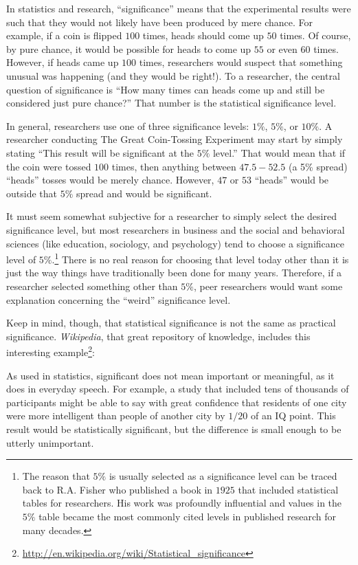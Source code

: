 In statistics and research, ``significance'' means that the experimental results were such that they would not likely have been produced by mere chance. For example, if a coin is flipped $ 100 $ times, heads should come up $ 50 $ times. Of course, by pure chance, it would be possible for heads to come up $ 55 $ or even $ 60 $ times. However, if heads came up $ 100 $ times, researchers would suspect that something unusual was happening (and they would be right!). To a researcher, the central question of significance is ``How many times can heads come up and still be considered just pure chance?'' That number is the statistical significance level. 

In general, researchers use one of three significance levels: $ 1\% $, $ 5\% $, or $ 10\% $. A researcher conducting The Great Coin-Tossing Experiment may start by simply stating ``This result will be significant at the $ 5\% $ level.'' That would mean that if the coin were tossed $ 100 $ times, then anything between $ 47.5-52.5 $ (a 5\% spread) ``heads'' tosses would be merely chance. However, $ 47 $ or $ 53 $ ``heads'' would be outside that $ 5\% $ spread and would be significant. 

It must seem somewhat subjective for a researcher to simply select the desired significance level, but most researchers in business and the social and behavioral sciences (like education, sociology, and psychology) tend to choose a significance level of $ 5\% $.\footnote{The reason that $ 5\% $ is usually selected as a significance level can be traced back to R.A. Fisher who published a book in $ 1925 $ that included statistical tables for researchers. His work was profoundly influential and values in the $ 5\% $ table became the most commonly cited levels in published research for many decades.} There is no real reason for choosing that level today other than it is just the way things have traditionally been done for many years. Therefore, if a researcher selected something other than $ 5\% $, peer researchers would want some explanation concerning the ``weird'' significance level.

Keep in mind, though, that statistical significance is not the same as practical significance. \textit{Wikipedia}, that great repository of knowledge, includes this interesting example\footnote{\url{http://en.wikipedia.org/wiki/Statistical\_significance}}: 

\bigskip
\hfill\begin{minipage}{\dimexpr\textwidth-1cm}
As used in statistics, significant does not mean important or meaningful, as it does in everyday speech. For example, a study that included tens of thousands of participants might be able to say with great confidence that residents of one city were more intelligent than people of another city by $ 1/20 $ of an IQ point. This result would be statistically significant, but the difference is small enough to be utterly unimportant.
\end{minipage}
\bigskip

